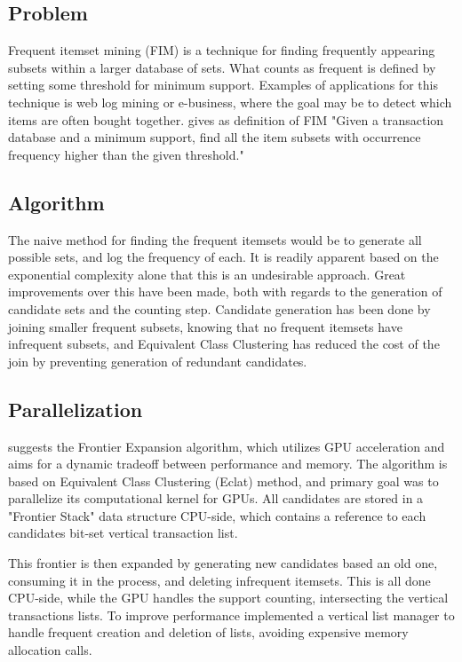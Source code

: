 \documentclass[twocolumn]{article} %
\begin{document}
	\subsection*{Problem}
		Frequent itemset mining (FIM) is a technique for finding frequently appearing subsets within a larger database of sets. What
		counts as frequent is defined by setting some threshold for minimum support. Examples of applications for this
		technique is web log mining or e-business, where the goal may be to detect which items are often bought together. \cite{zhang13}
		gives as definition of FIM "Given a transaction database and a minimum support, find all the item subsets with
		occurrence frequency higher than the given threshold."
	\subsection*{Algorithm}
		The naive method for finding the frequent itemsets would be to generate all possible sets, and log the frequency of
		each. It is readily apparent based on the exponential complexity alone that this is an undesirable approach.
		Great improvements over this have been made, both with regards to the generation of candidate sets and the counting
		step. Candidate generation has been done by joining smaller frequent subsets, knowing that no frequent itemsets have
		infrequent subsets, and Equivalent Class Clustering has reduced the cost of the join by preventing generation of
		redundant candidates. 
		
	\subsection*{Parallelization}
		\cite{zhang13} suggests the Frontier Expansion algorithm, which utilizes GPU acceleration and aims for a dynamic tradeoff
		between performance and memory. The algorithm is based on Equivalent Class Clustering (Eclat) method, and primary goal
		was to parallelize its computational kernel for GPUs. All candidates are stored in a "Frontier Stack" data structure
		CPU-side, which contains a reference to each candidates bit-set vertical transaction list.
		
		This frontier is then expanded by generating new candidates based an old one, consuming it in the process, and
		deleting infrequent itemsets. This is all done CPU-side, while the GPU handles the support counting, intersecting the
		vertical transactions lists. To improve performance \cite{zhang13} implemented a vertical list manager to handle frequent
		creation and deletion of lists, avoiding expensive memory allocation calls.
		
\end{document}
